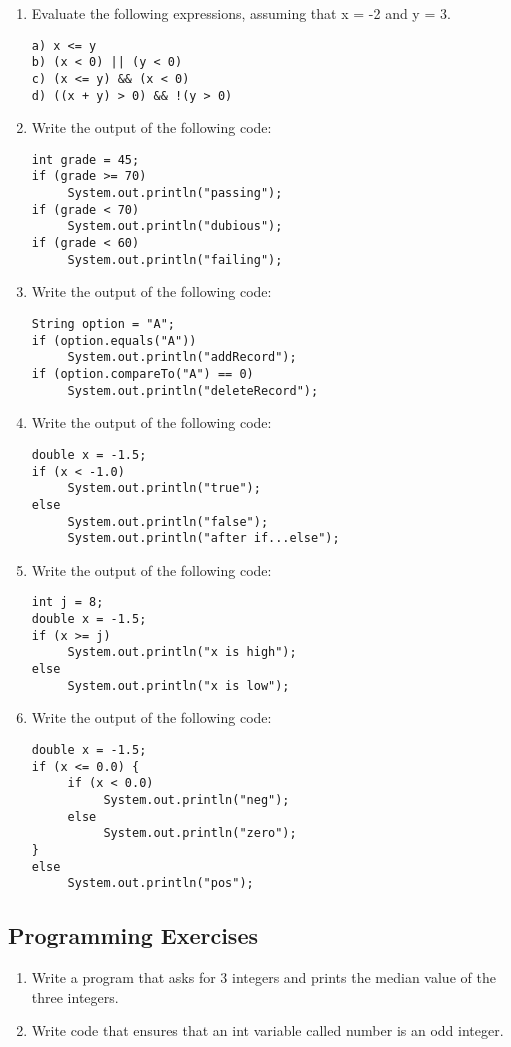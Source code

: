 \begin{enumerate}[label={\arabic{counter}\addtocounter{counter}{1}}.]
\item Evaluate the following expressions, assuming that x = -2 and y = 3.
\begin{lstlisting} 
a) x <= y 
b) (x < 0) || (y < 0)
c) (x <= y) && (x < 0)
d) ((x + y) > 0) && !(y > 0)
\end{lstlisting}

\item Write the output of the following code:
\begin{lstlisting}
int grade = 45;
if (grade >= 70)
     System.out.println("passing");
if (grade < 70)
     System.out.println("dubious");
if (grade < 60)
     System.out.println("failing");
\end{lstlisting}

\item Write the output of the following code:
\begin{lstlisting}
String option = "A";
if (option.equals("A"))
     System.out.println("addRecord");
if (option.compareTo("A") == 0)
     System.out.println("deleteRecord");
\end{lstlisting}

\item Write the output of the following code:
\begin{lstlisting}
double x = -1.5;
if (x < -1.0)
     System.out.println("true");
else
     System.out.println("false");
     System.out.println("after if...else");
\end{lstlisting}

\item Write the output of the following code:
\begin{lstlisting}
int j = 8;
double x = -1.5;
if (x >= j)
     System.out.println("x is high");
else
     System.out.println("x is low");
\end{lstlisting}

\item Write the output of the following code:
\begin{lstlisting}
double x = -1.5;
if (x <= 0.0) {
     if (x < 0.0)
          System.out.println("neg");
     else
          System.out.println("zero");
}
else
     System.out.println("pos");
\end{lstlisting}

\end{enumerate}

\subsection{Programming Exercises}

\setcounter{counter}{1}
\begin{enumerate}[label={\arabic{counter}\addtocounter{counter}{1}}.]

\item Write a program that asks for 3 integers and prints the median value of the three integers.

\item Write code that ensures that an int variable called number is an odd integer.

\end{enumerate}